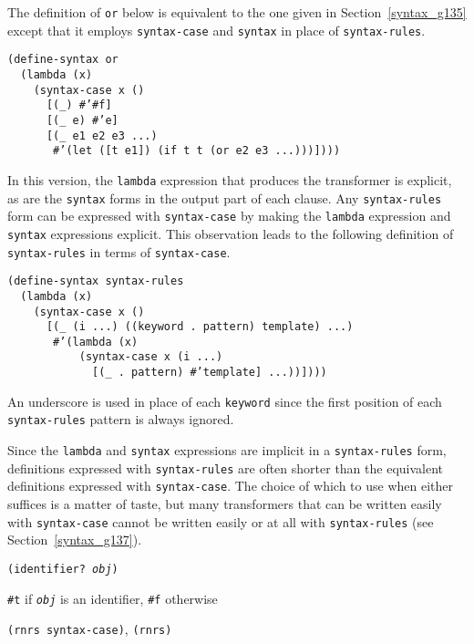 The definition of \texttt{or} below is equivalent to the one given in
Section \ref{syntax_g135} except that it employs \texttt{syntax-case} and
\texttt{syntax} in place of \texttt{syntax-rules}.


\begin{alltt}
(define-syntax or
  (lambda (x)
    (syntax-case x ()
      [(\_{}) \#{}'\#{}f]
      [(\_{} e) \#{}'e]
      [(\_{} e1 e2 e3 ...)
       \#{}'(let ([t e1]) (if t t (or e2 e3 ...)))])))
\end{alltt}


In this version, the \texttt{lambda} expression that produces the
transformer is explicit, as are the \texttt{syntax} forms in the output
part of each clause.
Any \texttt{syntax-rules} form can be expressed with
\texttt{syntax-case} by making the \texttt{lambda} expression and
\texttt{syntax} expressions explicit.
This observation leads to the following definition of
\label{syntax_s34}\texttt{syntax-rules} in terms of
\texttt{syntax-case}.


\begin{alltt}
(define-syntax syntax-rules
  (lambda (x)
    (syntax-case x ()
      [(\_{} (i ...) ((keyword . pattern) template) ...)
       \#{}'(lambda (x)
           (syntax-case x (i ...)
             [(\_{} . pattern) \#{}'template] ...))])))
\end{alltt}


An underscore is used in place of
each \texttt{keyword} since the first position
of each \texttt{syntax-rules} pattern is always ignored.


Since the \texttt{lambda} and \texttt{syntax} expressions are
implicit in a \texttt{syntax-rules} form, definitions expressed with
\texttt{syntax-rules} are often shorter than the equivalent definitions
expressed with \texttt{syntax-case}.
The choice of which to use when either suffices is a matter of
taste, but many transformers that can be written easily with
\texttt{syntax-case} cannot be written easily or at all with \texttt{syntax-rules}
(see Section \ref{syntax_g137}).

\begin{description}

\label{syntax_s35}\item[procedure] \texttt{(identifier? \textit{obj})}



\item[returns] \texttt{\#{}t} if \texttt{\textit{obj}} is an identifier, \texttt{\#{}f} otherwise


\item[libraries] \texttt{(rnrs syntax-case)}, \texttt{(rnrs)}
\end{description}


